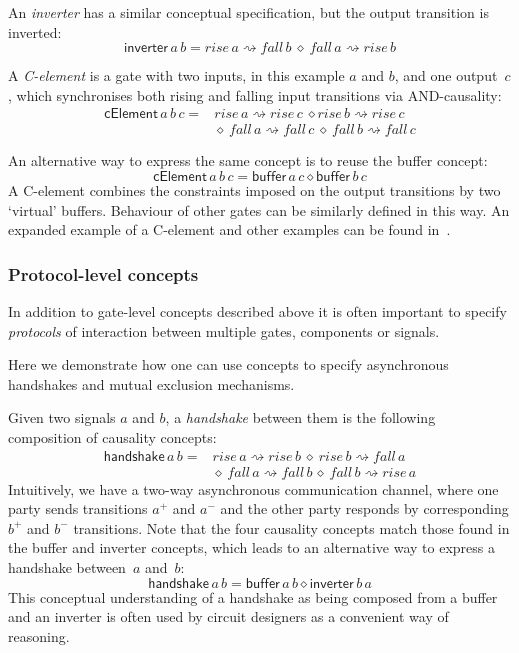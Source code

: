 \documentclass[british,conference,compsoc]{IEEEtran}
\begin{document}
\noindent An \emph{inverter} has a similar conceptual specification, but the
output transition is inverted:
\[
\mathsf{inverter}\,a\,b=rise\,a\rightsquigarrow fall\,b\ \diamond\
fall\,a\rightsquigarrow rise\,b
\]

\noindent A \emph{C-element} is a gate with two inputs, in this example $a$ and $b$, and one
output~$c$, which synchronises both rising and falling input transitions
via AND-causality:
\[
\begin{array}{lcl}
\mathsf{cElement}\,a\, b\, c =& rise\,a\!\rightsquigarrow\! rise\,c\ \diamond rise\,b\!\rightsquigarrow\! rise\,c\ \\
&\diamond\ fall\,a\!\rightsquigarrow\! fall\,c\ \diamond\ fall\,b\!\rightsquigarrow\! fall\,c
\end{array}
\]

An alternative way to express the same concept is to reuse the buffer concept:
\[
\mathsf{cElement}\,a\, b\, c=\mathsf{buffer}\,a\, c \diamond \mathsf{buffer}\,b\, c
\]
A C-element combines the constraints imposed on the output
transitions by two `virtual' buffers. Behaviour of other gates can be similarly defined in this way.
An expanded example of a C-element and other examples can be found in~\cite{2015_Beaumont_MEMOCODE}.

\subsubsection{Protocol-level concepts} In addition to gate-level concepts
described above it is often important to specify \emph{protocols}
of interaction between multiple gates, components or signals. 

Here we demonstrate how one can use concepts to specify asynchronous handshakes
and mutual exclusion mechanisms.

Given two signals $a$ and $b$, a \emph{handshake} between them is
the following composition of causality concepts:
\[
\begin{array}{lcl}
\mathsf{handshake}\,a\, b=&rise\,a\!\rightsquigarrow\! rise\,b\ \diamond\ rise\,b\!\rightsquigarrow\! fall\,a \\
&\diamond\ fall\,a\!\rightsquigarrow\! fall\,b \, \diamond\ fall\,b \rightsquigarrow\! rise\,a
\end{array}
\]
Intuitively, we have a two-way asynchronous communication channel,
where one party sends transitions $a^{+}$ and $a^{-}$ and the other
party responds by corresponding $b^{+}$ and $b^{-}$ transitions.
Note that the four causality concepts match those found
in the buffer and inverter concepts, which leads to an alternative
way to express a handshake between~$a$ and~$b$:
\[
\mathsf{handshake}\,a\, b=\mathsf{buffer}\,a\, b \diamond\mathsf{inverter}\,b\, a
\]
This conceptual understanding of a handshake as being composed
from a buffer and an inverter is often used by circuit designers as
a convenient way of reasoning.
\end{document}
